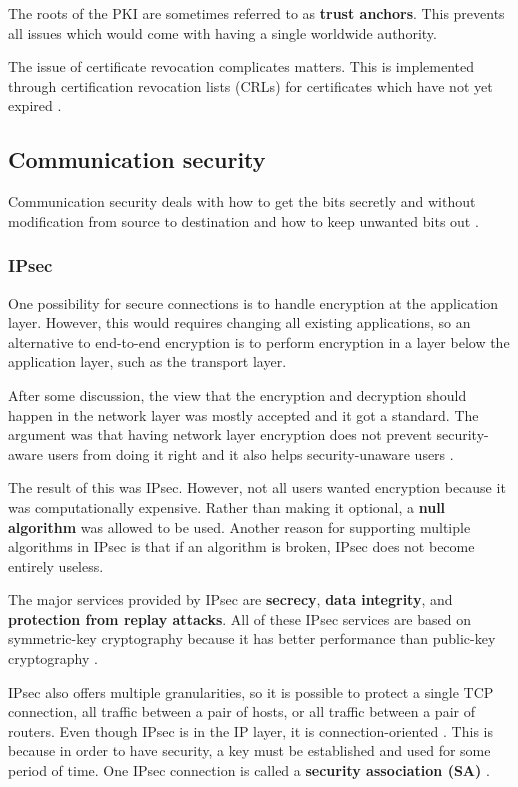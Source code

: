 The roots of the PKI are sometimes referred to as \textbf{trust anchors}.
This prevents all issues which would come with having a single worldwide authority.

The issue of certificate revocation complicates matters.
This is implemented through certification revocation lists (CRLs) for certificates which have not yet expired \cite[p.~813]{computer-networks-tanenbaum-2012}.

\subsection{Communication security}

Communication security deals with how to get the bits secretly and without modification from source to destination and how to keep unwanted bits out \cite[p.~813]{computer-networks-tanenbaum-2012}.

\subsubsection{IPsec}

One possibility for secure connections is to handle encryption at the application layer.
However, this would requires changing all existing applications, so an alternative to end-to-end encryption is to perform encryption in a layer below the application layer, such as the transport layer.

After some discussion, the view that the encryption and decryption should happen in the network layer was mostly accepted and it got a standard.
The argument was that having network layer encryption does not prevent security-aware users from doing it right and it also helps security-unaware users \cite[p.~814]{computer-networks-tanenbaum-2012}.

The result of this was IPsec. However, not all users wanted encryption because it was computationally expensive.
Rather than making it optional, a \textbf{null algorithm} was allowed to be used.
Another reason for supporting multiple algorithms in IPsec is that if an algorithm is broken, IPsec does not become entirely useless.

The major services provided by IPsec are \textbf{secrecy}, \textbf{data integrity}, and \textbf{protection from replay attacks}.
All of these IPsec services are based on symmetric-key cryptography because it has better performance than public-key cryptography \cite[p.~814]{computer-networks-tanenbaum-2012}.

IPsec also offers multiple granularities, so it is possible to protect a single TCP connection, all traffic between a pair of hosts, or all traffic between a pair of routers.
Even though IPsec is in the IP layer, it is connection-oriented \cite[p.~814]{computer-networks-tanenbaum-2012}.
This is because in order to have security, a key must be established and used for some period of time.
One IPsec connection is called a \textbf{security association (SA)} \cite[p.~815]{computer-networks-tanenbaum-2012}.

